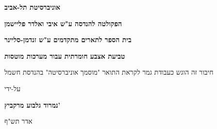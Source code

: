 \begin{otherlanguage}{hebrew}
\begin{center}
\begin{davidfont}
  \vspace*{1cm}
  
  \large
  \textbf{אוניברסיטת תל-אביב}
   
  \footnotesize
  \textbf{הפקולטה להנדסה ע"ש איבי ואלדר פליישמן}
   
  \textbf{בית הספר לתארים מתקדמים ע"ש זנדמן-סליינר}
  
  \vspace{1.2cm}
  \LARGE
  \textbf{טביעת אצבע חומרתית עבור מערכות מוטסות}
   
  \vspace{1.5cm}
   
  \normalsize
  חיבור זה הוגש כעבודת גמר לקראת התואר "מוסמך אוניברסיטה" בהנדסת חשמל
   
  \vspace{0.5cm}
  על-ידי
   
  \Large
  \textbf{נמרוד גלבוע מרקביץ'}
  
  \vspace{0.5cm}
  \large
  אדר תש"ף
\end{davidfont}
\end{center}
\end{otherlanguage}
